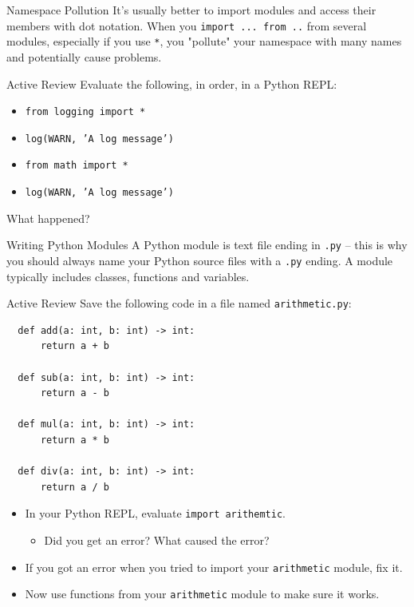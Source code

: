 \documentclass[smaller, aspectratio=1610]{beamer}
\begin{document}
\begin{frame}[label={sec:orgedf8d14},fragile]{Namespace Pollution}
 It's usually better to import modules and access their members with dot notation.  When you \texttt{import ... from ..} from several modules, especially if you use \texttt{*}, you "pollute" your namespace with many names and potentially cause problems.

\begin{block}{Active Review}
Evaluate the following, in order, in a Python REPL:

\begin{itemize}
\item \texttt{from logging import *}
\item \texttt{log(WARN, 'A log message')}
\item \texttt{from math import *}
\item \texttt{log(WARN, 'A log message')}
\end{itemize}

What happened?
\end{block}
\end{frame}

\begin{frame}[label={sec:org0e4cdc1},fragile]{Writing Python Modules}
 A Python module is text file ending in \texttt{.py} -- this is why you should always name your Python source files with a \texttt{.py} ending.  A module typically includes classes, functions and variables.

\begin{block}{Active Review}
Save the following code in a file named \texttt{arithmetic.py}:

\lstset{language=Python,label= ,caption= ,captionpos=b,numbers=none}
\begin{lstlisting}
  def add(a: int, b: int) -> int:
      return a + b

  def sub(a: int, b: int) -> int:
      return a - b

  def mul(a: int, b: int) -> int:
      return a * b

  def div(a: int, b: int) -> int:
      return a / b
\end{lstlisting}

\begin{itemize}
\item In your Python REPL, evaluate \texttt{import arithemtic}.
\begin{itemize}
\item Did you get an error?  What caused the error?
\end{itemize}
\item If you got an error when you tried to import your \texttt{arithmetic} module, fix it.
\item Now use functions from your \texttt{arithmetic} module to make sure it works.
\end{itemize}
\end{block}
\end{frame}
\end{document}
